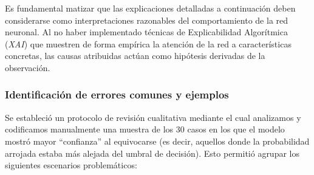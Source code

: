 Es fundamental matizar que las explicaciones detalladas a continuación deben considerarse como interpretaciones razonables del comportamiento de la red neuronal. Al no haber implementado técnicas de Explicabilidad Algorítmica (\textit{XAI}) que muestren de forma empírica la atención de la red a características concretas, las causas atribuidas actúan como hipótesis derivadas de la observación. 

\subsubsection*{Identificación de errores comunes y ejemplos}
\label{subsubsec:IdentificacionDeErroresComunesYEjemplos}
Se estableció un protocolo de revisión cualitativa mediante el cual analizamos y codificamos manualmente una muestra de los 30 casos en los que el modelo mostró mayor ``confianza'' al equivocarse (es decir, aquellos donde la probabilidad arrojada estaba más alejada del umbral de decisión). Esto permitió agrupar los siguientes escenarios problemáticos:
